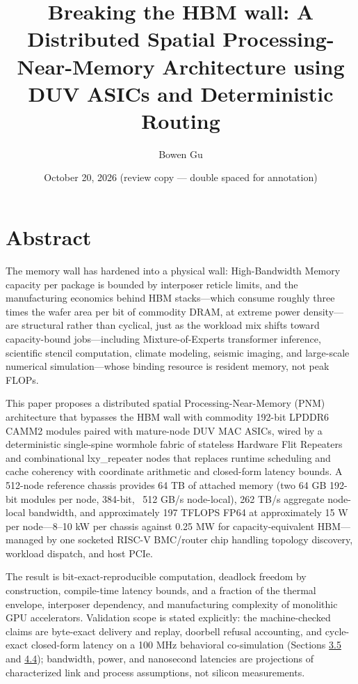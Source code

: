 \documentclass[12pt,onecolumn]{article}
\title{Breaking the HBM wall: A Distributed Spatial Processing-Near-Memory Architecture using DUV ASICs and Deterministic Routing}
\author{Bowen Gu}
\date{October 20, 2026 (review copy — double spaced for annotation)}
\begin{document}
\maketitle
\thispagestyle{empty}

\section*{Abstract}\label{sec:abstract}

The memory wall has hardened into a physical wall: High-Bandwidth Memory capacity per package is bounded by interposer reticle limits\cite{15}, and the manufacturing economics behind HBM stacks---which consume roughly three times the wafer area per bit of commodity DRAM, at extreme power density---are structural rather than cyclical\cite{25}, just as the workload mix shifts toward capacity-bound jobs---including Mixture-of-Experts transformer inference, scientific stencil computation, climate modeling, seismic imaging, and large-scale numerical simulation---whose binding resource is resident memory, not peak FLOPs\cite{3,4,26}.

This paper proposes a distributed spatial Processing-Near-Memory (PNM) architecture that bypasses the HBM wall with commodity 192-bit LPDDR6 CAMM2 modules\cite{16,17} paired with mature-node DUV MAC ASICs, wired by a deterministic single-spine wormhole fabric of stateless Hardware Flit Repeaters and combinational lxy\_repeater nodes that replaces runtime scheduling and cache coherency with coordinate arithmetic and closed-form latency bounds\cite{13,14}. A 512-node reference chassis provides 64 TB of attached memory (two 64 GB 192-bit modules per node, 384-bit, ~512 GB/s node-local), 262 TB/s aggregate node-local bandwidth, and approximately 197 TFLOPS FP64 at approximately 15 W per node---8--10 kW per chassis against 0.25 MW for capacity-equivalent HBM---managed by one socketed RISC-V BMC/router chip handling topology discovery, workload dispatch, and host PCIe\cite{5}.

The result is bit-exact-reproducible computation, deadlock freedom by construction, compile-time latency bounds, and a fraction of the thermal envelope, interposer dependency, and manufacturing complexity of monolithic GPU accelerators. Validation scope is stated explicitly: the machine-checked claims are byte-exact delivery and replay, doorbell refusal accounting, and cycle-exact closed-form latency on a 100 MHz behavioral co-simulation (Sections \hyperref[sec:3.5]{3.5} and \hyperref[sec:4.4]{4.4}); bandwidth, power, and nanosecond latencies are projections of characterized link and process assumptions, not silicon measurements.
\end{document}
